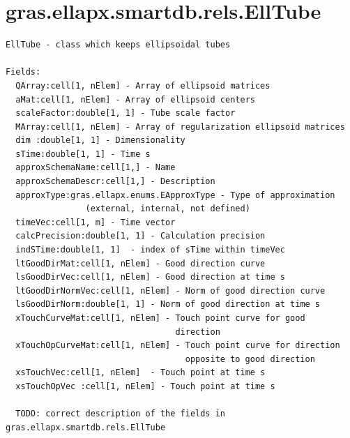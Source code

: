\documentclass[letterpaper,10pt,english]{sphinxmanual}
\begin{document}
\section{gras.ellapx.smartdb.rels.EllTube}
\label{chap_func:gras-ellapx-smartdb-rels-elltube}
\begin{Verbatim}[commandchars=\\\{\}]
EllTube - class which keeps ellipsoidal tubes

Fields:
  QArray:cell[1, nElem] - Array of ellipsoid matrices
  aMat:cell[1, nElem] - Array of ellipsoid centers
  scaleFactor:double[1, 1] - Tube scale factor
  MArray:cell[1, nElem] - Array of regularization ellipsoid matrices
  dim :double[1, 1] - Dimensionality
  sTime:double[1, 1] - Time s
  approxSchemaName:cell[1,] - Name
  approxSchemaDescr:cell[1,] - Description
  approxType:gras.ellapx.enums.EApproxType - Type of approximation
                (external, internal, not defined)
  timeVec:cell[1, m] - Time vector
  calcPrecision:double[1, 1] - Calculation precision
  indSTime:double[1, 1]  - index of sTime within timeVec
  ltGoodDirMat:cell[1, nElem] - Good direction curve
  lsGoodDirVec:cell[1, nElem] - Good direction at time s
  ltGoodDirNormVec:cell[1, nElem] - Norm of good direction curve
  lsGoodDirNorm:double[1, 1] - Norm of good direction at time s
  xTouchCurveMat:cell[1, nElem] - Touch point curve for good
                                  direction
  xTouchOpCurveMat:cell[1, nElem] - Touch point curve for direction
                                    opposite to good direction
  xsTouchVec:cell[1, nElem]  - Touch point at time s
  xsTouchOpVec :cell[1, nElem] - Touch point at time s

  TODO: correct description of the fields in gras.ellapx.smartdb.rels.EllTube
\end{Verbatim}
\end{document}

